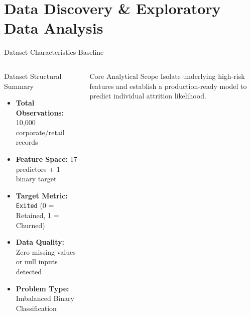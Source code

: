 \section{Data Discovery \& Exploratory Data Analysis}

\begin{frame}{Dataset Characteristics Baseline}
\begin{columns}[c]
\begin{block}{Dataset Structural Summary}
\begin{itemize}
    \item \textbf{Total Observations:} 10,000 corporate/retail records
    \item \textbf{Feature Space:} 17 predictors + 1 binary target
    \item \textbf{Target Metric:} \texttt{Exited} (0 = Retained, 1 = Churned)
    \item \textbf{Data Quality:} Zero missing values or null inputs detected
    \item \textbf{Problem Type:} Imbalanced Binary Classification
\end{itemize}
\end{block}

\begin{exampleblock}{Core Analytical Scope}
Isolate underlying high-risk features and establish a production-ready model to predict individual attrition likelihood.
\end{exampleblock}
\end{columns}
\end{frame}

